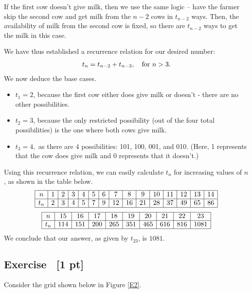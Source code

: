 \documentclass{article}
\newcounter{counter}
\newcommand{\Exercise}{Exercise \stepcounter{counter}\thecounter}
\begin{document}
    \vspace{2mm}
    \qquad If the first cow doesn't give milk, then we use the same logic -- have the farmer skip the second cow and get milk from the $n - 2$ cows in $t_{n-2}$ ways. Then, the availability of milk from the second cow is fixed, so there are $t_{n - 2}$ ways to get the milk in this case.
    
    \vspace{2mm}
    We have thus established a recurrence relation for our desired number: $$t_{n} = t_{n - 2} + t_{n - 3}, \text{\quad for $n > 3$}.$$ We now deduce the base cases.
    
    \begin{itemize}
        \item $t_1 = 2$, because the first cow either does give milk or doesn't - there are no other possibilities.
        \item $t_2 = 3$, because the only restricted possibility (out of the four total possibilities) is the one where both cows give milk.
        \item $t_3 = 4,$ as there are $4$ possibilities: 101, 100, 001, and 010. (Here, 1 represents that the cow does give milk and 0 represents that it doesn't.)
    \end{itemize}
    Using this recurrence relation, we can easily calculate $t_{n}$ for increasing values of $n$, as shown in the table below.
    $$\begin{array}{|c|c|c|c|c|c|c|c|c|c|c|c|c|c|c|c|c|c|c|c|c|c|c|c|c|c|c|c|}
        \hline
        n & 1 & 2 & 3 & 4 & 5 & 6 & 7 & 8 & 9 & 10 & 11 & 12 & 13 & 14 \\
        \hline
        t_{n} & 2 & 3 & 4 & 5 & 7 & 9 & 12 & 16 & 21 & 28 & 37 & 49 & 65 & 86 \\
        \hline
    \end{array}$$
    $$\begin{array}{|c|c|c|c|c|c|c|c|c|c|c|c|c|c|c|c|c|c|c|c|c|c|c|c|c|c|c|c|}
        \hline
        n & 15 & 16 & 17 & 18 & 19 & 20 & 21 & 22 & 23 \\
        \hline
        t_{n} & 114 & 151 & 200 & 265 & 351 & 465 & 616 & 816 & 1081 \\
        \hline
    \end{array}$$
    We conclude that our answer, as given by $t_{23}$, is $\boxed{1081}$.

\subsection*{\Exercise \ {\bf [1 pt]}}
    Consider the grid shown below in Figure \ref*{E2}.
    
\end{document}
